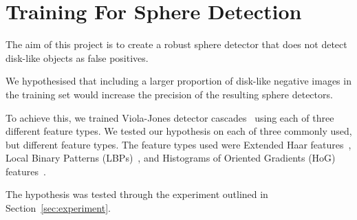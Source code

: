 \documentclass{llncs}
\begin{document}
	\section{Training For Sphere Detection} {

		The aim of this project is to create a robust sphere detector that does not detect disk-like objects as false positives.

		We hypothesised that including a larger proportion of disk-like negative images in the training set would increase the precision of the resulting sphere detectors.

		To achieve this, we trained Viola-Jones detector cascades~\citep{viola2001rapid} using each of three different feature types. We tested our hypothesis on each of three commonly used, but different feature types. The feature types used were Extended Haar features~\citep{Lienhart2002extended}, Local Binary Patterns (LBPs)~\citep{liao2007learning}, and Histograms of Oriented Gradients (HoG) features~\citep{dalal2005histograms}.

		The hypothesis was tested through the experiment outlined in Section~\ref{sec:experiment}.

	}
\end{document}
